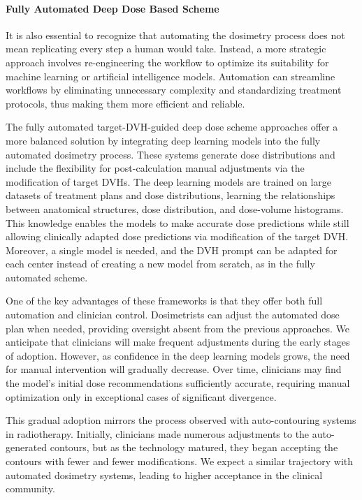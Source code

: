 \paragraph{Fully Automated Deep Dose Based Scheme}
It is also essential to recognize that automating the dosimetry process does not mean replicating every step a human would take.
Instead, a more strategic approach involves re-engineering the workflow to optimize its suitability for machine learning or artificial intelligence models.
Automation can streamline workflows by eliminating unnecessary complexity and standardizing treatment protocols, thus making them more efficient and reliable.

The fully automated target-DVH-guided deep dose scheme approaches offer a more balanced solution by integrating deep learning models into the fully automated dosimetry process.
These systems generate dose distributions and include the flexibility for post-calculation manual adjustments via the modification of target DVHs.
The deep learning models are trained on large datasets of treatment plans and dose distributions, learning the relationships between anatomical structures, dose distribution, and dose-volume histograms.
This knowledge enables the models to make accurate dose predictions while still allowing clinically adapted dose predictions via modification of the target DVH.
Moreover, a single model is needed, and the DVH prompt can be adapted for each center instead of creating a new model from scratch, as in the fully automated scheme.

One of the key advantages of these frameworks is that they offer both full automation and clinician control.
Dosimetrists can adjust the automated dose plan when needed, providing oversight absent from the previous approaches.
We anticipate that clinicians will make frequent adjustments during the early stages of adoption.
However, as confidence in the deep learning models grows, the need for manual intervention will gradually decrease.
Over time, clinicians may find the model's initial dose recommendations sufficiently accurate, requiring manual optimization only in exceptional cases of significant divergence.

This gradual adoption mirrors the process observed with auto-contouring systems in radiotherapy.
Initially, clinicians made numerous adjustments to the auto-generated contours, but as the technology matured, they began accepting the contours with fewer and fewer modifications.
We expect a similar trajectory with automated dosimetry systems, leading to higher acceptance in the clinical community.

